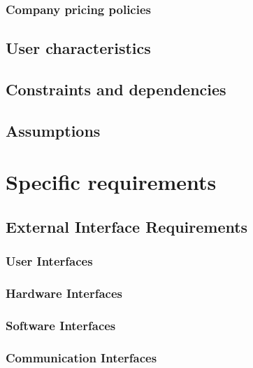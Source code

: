 \documentclass[a4paper,oneside,11pt]{article}
\begin{document}
            \subsubsection{Company pricing policies}
            
        \subsection{User characteristics}
            
        \subsection{Constraints and dependencies}
            
        \subsection{Assumptions}
            
        
    \newpage
    \section{Specific requirements}
         
        \subsection{External Interface Requirements}
          \subsubsection{User Interfaces}
                
            \subsubsection{Hardware Interfaces}
                
            \subsubsection{Software Interfaces}
                
            \subsubsection{Communication Interfaces}
                
\end{document}
